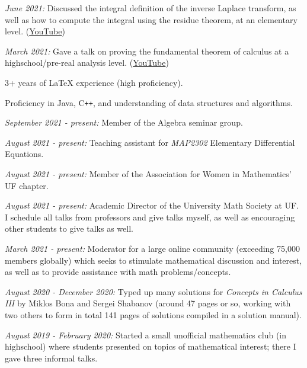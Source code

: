 \documentclass[11pt]{article}
\begin{document}
\textsl{June 2021:} Discussed the integral definition of the inverse Laplace transform, as well as how to compute the integral using the residue theorem, at an elementary level. ({\color{blue}\href{https://youtu.be/20Xbrit2chw}{YouTube}})

\textsl{March 2021:} Gave a talk on proving the fundamental theorem of calculus at a highschool/pre-real analysis level. ({\color{blue}\href{https://youtu.be/l4GO-n-2ETQ}{YouTube}})


\noindent{}

3+ years of \LaTeX\hspace{1pt} experience (high proficiency).

Proficiency in Java, C\verb!++!, and understanding of data structures and algorithms. 

\noindent{}


\textsl{September 2021 - present:} Member of the Algebra seminar group.

\textsl{August 2021 - present:} Teaching assistant for \textsl{MAP2302} Elementary Differential Equations.

\textsl{August 2021 - present:} Member of the Association for Women in Mathematics' UF chapter.

\textsl{August 2021 - present:} Academic Director of the University Math Society at UF. I schedule all talks from professors and give talks myself, as well as encouraging other students to give talks as well.

\textsl{March 2021 - present:} Moderator for a large online community (exceeding 75,000 members globally) which seeks to stimulate mathematical discussion and interest, as well as to provide assistance with math problems/concepts.

\textsl{August 2020 - December 2020:} Typed up many solutions for \textsl{Concepts in Calculus
III} by Miklos Bona and Sergei Shabanov (around 47 pages or so, working with two others to form in total 141 pages of solutions compiled in a solution manual).

\textsl{August 2019 - February 2020:} Started a small unofficial mathematics club (in highschool) where students presented on topics of mathematical interest; there I gave three informal talks.

\noindent{}
\end{document}
